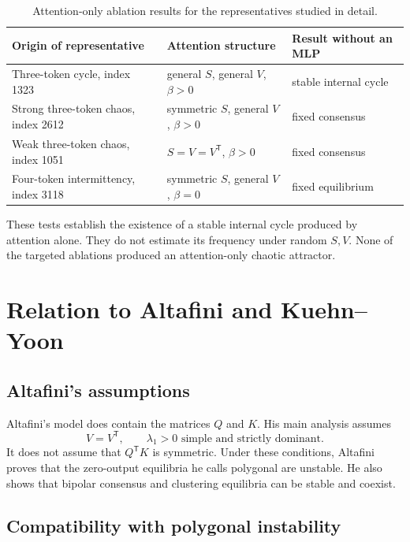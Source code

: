 \documentclass[11pt,a4paper]{article}
\theoremstyle{definition}
\newcommand{\T}{\mathsf T}
\begin{document}
\begin{table}[ht]
\centering
\caption{Attention-only ablation results for the representatives studied in detail.}
\label{tab:ablations}
\begin{tabularx}{\textwidth}{@{}lXl@{}}
\toprule
Origin of representative & Attention structure & Result without an MLP \\
\midrule
Three-token cycle, index 1323 & general $S$, general $V$, $\beta>0$ & stable internal cycle \\
Strong three-token chaos, index 2612 & symmetric $S$, general $V$, $\beta>0$ & fixed consensus \\
Weak three-token chaos, index 1051 & $S=V=V^{\T}$, $\beta>0$ & fixed consensus \\
Four-token intermittency, index 3118 & symmetric $S$, general $V$, $\beta=0$ & fixed equilibrium \\
\bottomrule
\end{tabularx}
\end{table}

These tests establish the existence of a stable internal cycle produced by attention
alone. They do not estimate its frequency under random $S,V$. None of the targeted
ablations produced an attention-only chaotic attractor.

\section{Relation to Altafini and Kuehn--Yoon}
\label{sec:comparison}

\subsection{Altafini's assumptions}

Altafini's model does contain the matrices $Q$ and $K$. His main analysis assumes
\begin{equation}
 V=V^{\T},\qquad \lambda_1>0\text{ simple and strictly dominant}.  \label{eq:altafini-assumption}
\end{equation}
It does not assume that $Q^{\T}K$ is symmetric. Under these conditions, Altafini proves
that the zero-output equilibria he calls polygonal are unstable. He also shows that
bipolar consensus and clustering equilibria can be stable and coexist.

\subsection{Compatibility with polygonal instability}
\end{document}
